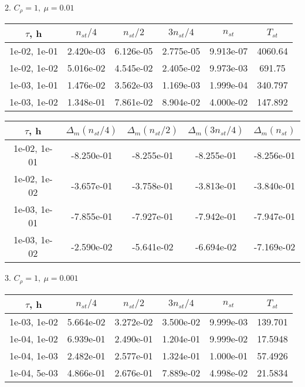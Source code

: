 2. $C_{\rho} = 1, \ \mu = 0.01$
\begin{center}
	\begin{tabular}{ |c|c|c|c|c|c| } 
		\hline
		$\tau$, h & $n_{st}/ 4$ & $n_{st}/ 2$ & $3n_{st}/ 4$ & $n_{st}$ & $T_{st}$ \\ 
		\hline
		1e-02, 1e-01 & 2.420e-03 & 6.126e-05 & 2.775e-05 & 9.913e-07 & 4060.64\\ 
		\hline
		1e-02, 1e-02 & 5.016e-02 & 4.545e-02 & 2.405e-02 & 9.973e-03 & 691.75\\ 
		\hline
		1e-03, 1e-01 & 1.476e-02 & 3.562e-03 & 1.169e-03 & 1.999e-04 & 340.797\\ 
		\hline
		1e-03, 1e-02 & 1.348e-01 & 7.861e-02 & 8.904e-02 & 4.000e-02 & 147.892\\ 
		\hline
	\end{tabular}
\end{center}

\begin{center}
	\begin{tabular}{ |c|c|c|c|c| } 
		\hline
		$\tau$, h & $\Delta_m (n_{st}/ 4)$ & $\Delta_m (n_{st}/ 2)$ & $\Delta_m (3n_{st}/ 4)$ & $\Delta_m (n_{st})$ \\ 
		\hline
		1e-02, 1e-01 & -8.250e-01 & -8.255e-01 & -8.255e-01 & -8.256e-01 \\ 
		\hline
		1e-02, 1e-02 & -3.657e-01 & -3.758e-01 & -3.813e-01 & -3.840e-01 \\ 
		\hline
		1e-03, 1e-01 & -7.855e-01 & -7.927e-01 & -7.942e-01 & -7.947e-01 \\ 
		\hline
		1e-03, 1e-02 & -2.590e-02 & -5.641e-02 & -6.694e-02 & -7.169e-02 \\ 
		\hline
	\end{tabular}
\end{center}

3. $C_{\rho} = 1, \ \mu = 0.001$
\begin{center}
	\begin{tabular}{ |c|c|c|c|c|c| } 
		\hline
		$\tau$, h & $n_{st}/ 4$ & $n_{st}/ 2$ & $3n_{st}/ 4$ & $n_{st}$ & $T_{st}$ \\ 
		\hline
		1e-03, 1e-02 & 5.664e-02 & 3.272e-02 & 3.500e-02 & 9.999e-03 & 139.701\\ 
		\hline
		1e-04, 1e-02 & 6.939e-01 & 2.490e-01 & 1.204e-01 & 9.999e-02 & 17.5948\\ 
		\hline
		1e-04, 1e-03 & 2.482e-01 & 2.577e-01 & 1.324e-01 & 1.000e-01 & 57.4926\\ 
		\hline
		1e-04, 5e-03 & 4.866e-01 & 2.676e-01 & 7.889e-02 & 4.998e-02 & 21.5834\\ 
		\hline
	\end{tabular}
\end{center}


